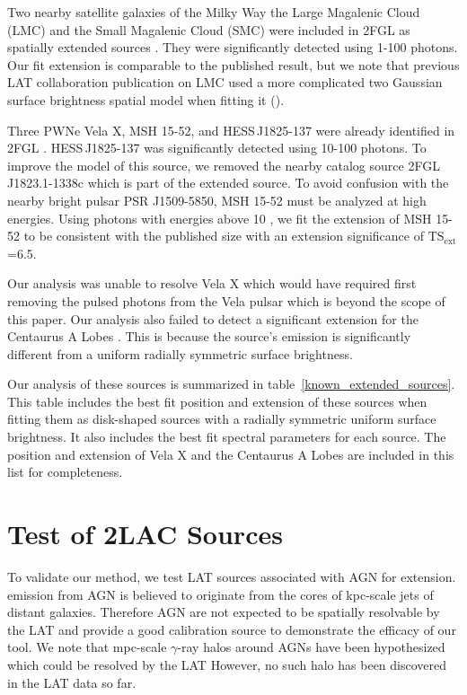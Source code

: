 \documentclass[12pt,preprint]{aastex}
\newcommand{\gev}{\text{GeV}\xspace}
\newcommand{\tsext}{{\ensuremath{\text{TS}_{\text{ext}}}}\xspace}
\begin{document}
Two nearby satellite galaxies of the Milky Way the Large Magalenic Cloud (LMC)
and the Small Magalenic
Cloud (SMC) were included in 2FGL as spatially extended sources \citep{lmc,smc}.  They were significantly
detected using 1-100 \gev photons. Our
fit extension is comparable to the published result, but we note that
previous LAT collaboration publication on LMC used a more complicated two Gaussian surface
brightness spatial model when fitting it (\citep{lmc}).

Three PWNe Vela X, MSH 15-52, and HESS\,J1825-137 were
already identified in 2FGL \citep{velax,msh1552,fermi_hess_j1825}.  
HESS\,J1825-137 was significantly detected using 10-100 \gev photons.
To improve the model of this source, we removed the
nearby catalog source 2FGL\,J1823.1-1338c which is part of the extended
source.  To avoid confusion with the nearby bright pulsar PSR J1509-5850, MSH 15-52 must be
analyzed at high energies.  Using photons with energies above 10 \gev,
we fit the extension of MSH 15-52 to be consistent with the published
size with an extension significance of \tsext=6.5.  

Our analysis was unable to resolve Vela X which would have required first
removing the pulsed photons from the Vela pulsar which is beyond the
scope of this paper.  Our analysis also failed to detect a significant
extension for the Centaurus A Lobes \citep{cen_a_lat}. This is because
the source's emission is significantly different from a uniform
radially symmetric surface brightness.

Our analysis of these sources is summarized in
table~\ref{known_extended_sources}.  This table includes the best fit
position and extension of these sources when fitting them as disk-shaped
sources with a radially symmetric uniform surface brightness. It also
includes the best fit spectral parameters for each source.  The position
and extension of Vela X and the Centaurus A Lobes are included in this
list for completeness.

\section{Test of 2LAC Sources}
\label{test_2lac_sources}

To validate our method, we test LAT sources associated with AGN for
extension.  \gev emission from AGN is believed to originate from the cores
of kpc-scale jets of distant galaxies.  Therefore AGN are not expected
to be spatially resolvable by the LAT and provide a good calibration source to
demonstrate the efficacy of our tool.  We note that mpc-scale $\gamma$-ray
halos around AGNs have been hypothesized \citep{pair_halo_paper} which
could be resolved by the LAT However, no such halo has been discovered
in the LAT data so far.
\end{document}
